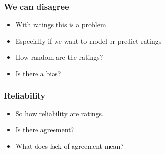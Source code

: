 \documentclass[bigger]{beamer}
\begin{document}
\begin{frame}
\frametitle{We can disagree}
\label{sec-1-3}


\begin{itemize}
\item With ratings this is a problem
\item Especially if we want to model or predict ratings
\item How random are the ratings?
\item Is there a bias?
\end{itemize}
\end{frame}
\begin{frame}
\frametitle{Reliability}
\label{sec-1-4}


\begin{itemize}
\item So how reliability are ratings.
\item Is there agreement?
\item What does lack of agreement mean?
\end{itemize}
\end{frame}
\end{document}
